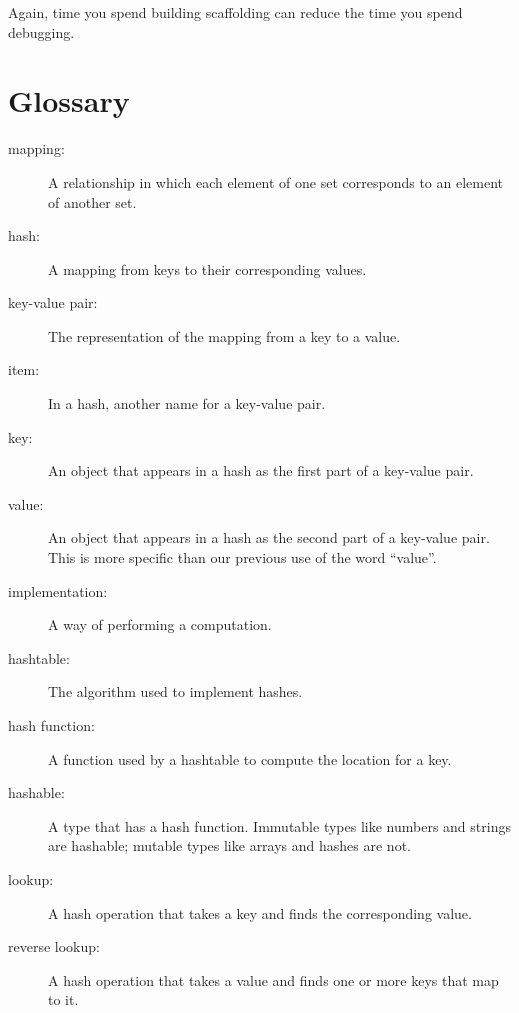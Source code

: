 Again, time you spend building scaffolding can reduce
the time you spend debugging.


\section{Glossary}

\begin{description}

\item[mapping:] A relationship in which each element of one set
corresponds to an element of another set.

\item[hash:] A mapping from keys to their
corresponding values.

\item[key-value pair:] The representation of the mapping from
a key to a value.

\item[item:] In a hash, another name for a key-value
  pair.

\item[key:] An object that appears in a hash as the
first part of a key-value pair.

\item[value:] An object that appears in a hash as the
second part of a key-value pair.  This is more specific than
our previous use of the word ``value''.

\item[implementation:] A way of performing a computation.

\item[hashtable:] The algorithm used to implement hashes.

\item[hash function:] A function used by a hashtable to 
compute the location for a key.

\item[hashable:] A type that has a hash function.  Immutable
types like numbers and strings are hashable; mutable types 
like arrays and hashes are not.

\item[lookup:] A hash operation that takes a key and finds
the corresponding value.

\item[reverse lookup:] A hash operation that takes a value and finds
one or more keys that map to it.


\end{description}
